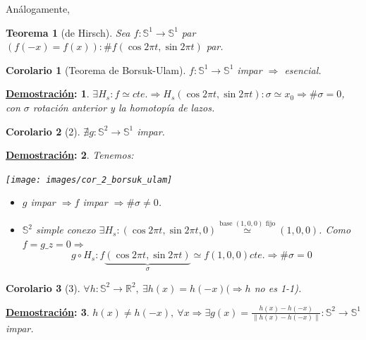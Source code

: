 \documentclass[10pt,a4paper,openright]{book}
\theoremstyle{break}
\newtheorem*{theo}{Teorema}
\newtheorem*{coro}{Corolario}
\newtheorem*{demo}{\underline{Demostración}:}
\begin{document}
Análogamente, 
\begin{theo}[de Hirsch]
Sea $f: \mathbb{S}^{1} \rightarrow \mathbb{S}^{1}$ par $\left( f\left( -x \right) = f\left( x \right) \right): \# f\left( \cos 2 \pi t, \sin 2 \pi t \right)$ par. 
\end{theo}
\begin{coro}[Teorema de Borsuk-Ulam]
$f: \mathbb{S}^{1} \rightarrow \mathbb{S}^{1}$ impar $\Rightarrow$ esencial.
\end{coro}
\begin{demo}
$\exists H_s : f \simeq cte. \Rightarrow H_s\left( \cos 2 \pi t, \sin 2 \pi t \right) : \sigma \simeq x_0 \Rightarrow \# \sigma = 0$, con $\sigma$ rotación anterior y la homotopía de lazos.
\end{demo}
\begin{coro}[2]
$\nexists g: \mathbb{S}^{2} \rightarrow \mathbb{S}^{1}$ impar. 
\end{coro}
\begin{demo}
Tenemos:
\begin{center}
    \texttt{[image: images/cor\_2\_borsuk\_ulam]} 
\end{center}
\begin{itemize}
    \item $g$ impar $\Rightarrow f$ impar $\Rightarrow \# \sigma \neq 0$.

    \item $\mathbb{S}^{2}$ simple conexo $\exists H_s : \left( \cos 2 \pi t, \sin 2\pi t, 0 \right) \stackrel{\text{base } \left( 1, 0, 0 \right) \text{ fijo}}{\simeq} \left( 1, 0, 0 \right)$. Como $f = g\_{z = 0} \Rightarrow$
    \[
    g \circ H_s : f\underbrace{\left( \cos 2 \pi t, \sin 2 \pi t \right)}_{\sigma} \simeq f\left( 1, 0, 0 \right) cte. \Rightarrow \# \sigma = 0
    \]
\end{itemize}
\end{demo}
\begin{coro}[3]
$\forall h: \mathbb{S}^{2} \rightarrow \mathbb{R}^{2},\ \exists h\left( x \right) = h\left( -x \right) (\Rightarrow h$ no es 1-1).  
\end{coro}
\begin{demo}
$h\left( x \right) \neq h\left( -x \right),\ \forall x \Rightarrow \exists g \left( x \right) = \frac{h\left( x \right) - h\left( -x \right)}{\lVert h\left( x \right) - h\left( -x \right) \rVert}: \mathbb{S}^{2} \rightarrow \mathbb{S}^{1}$ impar.
\end{demo}
\end{document}
